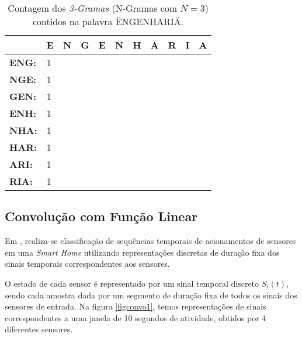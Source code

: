 \documentclass[
	12pt,				%
	openright,			%
	twoside,			%
	a4paper,			%
	english,			%
	spanish,			%
	brazil,				%
	]{abntex2}\usepackage[]{graphicx}\usepackage[]{color}
\begin{document}
\begin{table}[]
\centering
\begin{tabular}{lllllllllll}
              & \textbf{E} & \textbf{N} & \textbf{G} & \textbf{E} & \textbf{N} & \textbf{H} & \textbf{A} & \textbf{R} & \textbf{I} & \textbf{A} \\\hline
\textbf{ENG:} & 1          &            &            &            &            &            &            &            &            &            \\
\textbf{NGE:} & 1          &            &            &            &            &            &            &            &            &            \\
\textbf{GEN:} & 1          &            &            &            &            &            &            &            &            &            \\
\textbf{ENH:} & 1          &            &            &            &            &            &            &            &            &            \\
\textbf{NHA:} & 1          &            &            &            &            &            &            &            &            &            \\
\textbf{HAR:} & 1          &            &            &            &            &            &            &            &            &            \\
\textbf{ARI:} & 1          &            &            &            &            &            &            &            &            &            \\
\textbf{RIA:} & 1          &            &            &            &            &            &            &            &            &           
\end{tabular}
\caption{Contagem dos \textit{3-Gramas} (N-Gramas com $N = 3$) contidos na palavra \mbox{\"ENGENHARIA\"}. }
\end{table}

\subsection{Convolução com Função Linear}
\label{subconvo}

Em \cite{Lundstrom2016}, realiza-se classificação de sequências temporais de acionamentos de sensores em uma \textit{Smart Home} utilizando representações discretas de duração fixa dos sinais temporais correspondentes aos sensores.

O estado de cada sensor é representado por um sinal temporal discreto $S_i(t)$, sendo cada amostra dada por um segmento de duração fixa de todos os sinais dos sensores de entrada. Na figura \ref{figconvo1}, temos representações de sinais correspondentes a uma janela de 10 segundos de atividade, obtidos por 4 diferentes sensores.
\end{document}
